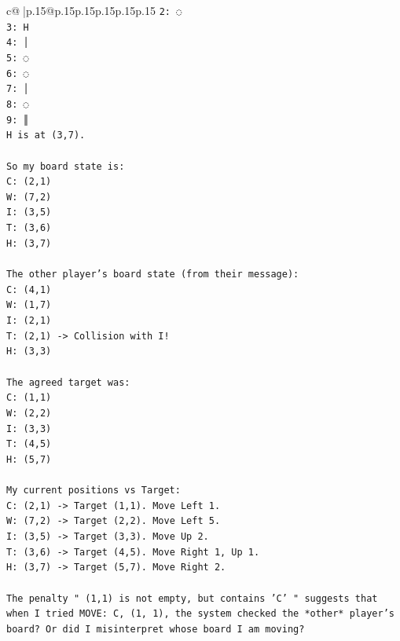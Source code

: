 \documentclass{article}
\begin{document}
{\begin{supertabular}{c@{$\;$}|p{.15\linewidth}@{}p{.15\linewidth}p{.15\linewidth}p{.15\linewidth}p{.15\linewidth}p{.15\linewidth}}
{{{\texttt{2: ◌} \\
\texttt{3: H} \\
\texttt{4: │} \\
\texttt{5: ◌} \\
\texttt{6: ◌} \\
\texttt{7: │} \\
\texttt{8: ◌} \\
\texttt{9: ║} \\
\texttt{H is at (3,7).} \\
\\ 
\texttt{So my board state is:} \\
\texttt{C: (2,1)} \\
\texttt{W: (7,2)} \\
\texttt{I: (3,5)} \\
\texttt{T: (3,6)} \\
\texttt{H: (3,7)} \\
\\ 
\texttt{The other player's board state (from their message):} \\
\texttt{C: (4,1)} \\
\texttt{W: (1,7)} \\
\texttt{I: (2,1)} \\
\texttt{T: (2,1) {-}> Collision with I!} \\
\texttt{H: (3,3)} \\
\\ 
\texttt{The agreed target was:} \\
\texttt{C: (1,1)} \\
\texttt{W: (2,2)} \\
\texttt{I: (3,3)} \\
\texttt{T: (4,5)} \\
\texttt{H: (5,7)} \\
\\ 
\texttt{My current positions vs Target:} \\
\texttt{C: (2,1) {-}> Target (1,1). Move Left 1.} \\
\texttt{W: (7,2) {-}> Target (2,2). Move Left 5.} \\
\texttt{I: (3,5) {-}> Target (3,3). Move Up 2.} \\
\texttt{T: (3,6) {-}> Target (4,5). Move Right 1, Up 1.} \\
\texttt{H: (3,7) {-}> Target (5,7). Move Right 2.} \\
\\ 
\texttt{The penalty " (1,1) is not empty, but contains 'C' " suggests that when I tried MOVE: C, (1, 1), the system checked the *other* player's board? Or did I misinterpret whose board I am moving?} \\
}}}
\end{supertabular}}
\end{document}
